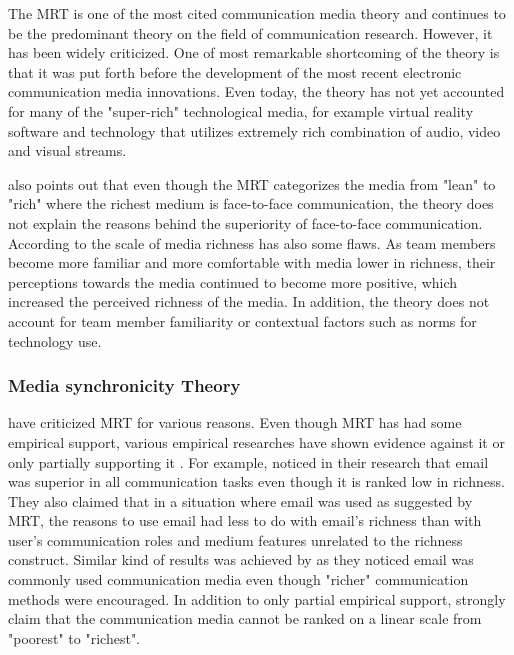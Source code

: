 \documentclass[english,12pt,a4paper,pdftex]{article}
\begin{document}
The \ac{MRT} is one of the most cited communication media theory and continues to be the predominant theory on the field of communication research. However, it has been widely criticized. One of most remarkable shortcoming of the theory is that it was put forth before the development of the most recent electronic communication media innovations. Even today, the theory has not yet accounted for many of the "super-rich" technological media, for example virtual reality software and technology that utilizes extremely rich combination of audio, video and visual streams. \citep{derosa2004}

\citet{derosa2004} also points out that even though the \ac{MRT} categorizes the media from "lean" to "rich" where the richest medium is face-to-face communication, the theory does not explain the reasons behind the superiority of face-to-face communication. According to \citet{derosa2004} the scale of media richness has also some flaws. As team members become more familiar and more comfortable with media lower in richness, their perceptions towards the media continued to become more positive, which increased the perceived richness of the media. In addition, the theory does not account for team member familiarity or contextual factors such as norms for technology use.

\subsubsection{Media synchronicity Theory}
\label{sec:media_synchronicity_theory}

\citet{dennis1999} have criticized \ac{MRT} for various reasons. Even though \ac{MRT} has had some empirical support, various empirical researches have shown evidence against it or only partially supporting it \citep{dennis1998} \citep{elshinnawy1997}. For example, \citet{elshinnawy1997} noticed in their research that email was superior in all communication tasks even though it is ranked low in richness. They also claimed that in a situation where email was used as suggested by \ac{MRT}, the reasons to use email had less to do with email's richness than with user's communication roles and medium features unrelated to the richness construct. Similar kind of results was achieved by \citet{korkala2006} as they noticed email was commonly used communication media even though "richer" communication methods were encouraged. In addition to only partial empirical support, \citet{dennis1999} strongly claim that the communication media cannot be ranked on a linear scale from "poorest" to "richest".
\end{document}
